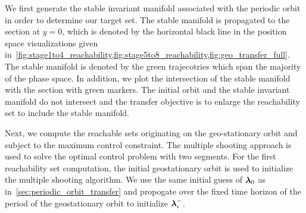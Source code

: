 \documentclass[smallcondensed]{svjour3}
\begin{document}
We first generate the stable invariant manifold associated with the periodic orbit in order to determine our target set.
The stable manifold is propagated to the \Poincare section at \( y = 0 \), which is denoted by the horizontal black line in the position space visualizations given in~\cref{fig:stage1to4_reachability,fig:stage5to8_reachability,fig:geo_transfer_full}.
The stable manifold is denoted by the green trajecotries which span the majority of the phase space. 
In addition, we plot the intersection of the stable manifold with the \Poincare section with green markers.
The initial orbit and the stable invariant manifold do not intersect and the transfer objective is to enlarge the reachability set to include the stable manifold.

Next, we compute the reachable sets originating on the geo-stationary orbit and subject to the maximum control constraint. 
The multiple shooting approach is used to solve the optimal control problem with two segments.
For the first reachability set computation, the initial geostationary orbit is used to initialize the multiple shooting algorithm.
We use the same initial guess of \( \bm{\lambda}_0\) as in~\cref{sec:periodic_orbit_transfer} and propogate over the fixed time horizon of the period of the geostationary orbit to initialize \( \bm{\lambda}_i^{-}\).
\end{document}
